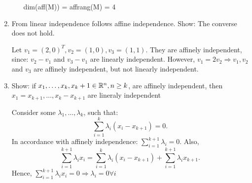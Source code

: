\documentclass{homework}
\begin{document}
\begin{enumerate}[label=(\alph*)]
\begin{enumerate}[label=(\roman*)]
dim(aff(M)) = affrang(M) = 4
\end{enumerate}
\item From linear independence follows affine independence. Show: The converse does not hold.

Let $v_1 = (2, 0)^T, v_2 = (1, 0), v_3 = (1, 1)$. They are affinely independent, since: $v_2 - v_1$ and $v_3 - v_1$ are linearly independent. However, $v_1 = 2 v_2 \Rightarrow v_1, v_2$ and $v_3$ are affinely independent, but not linearly independent.
\item Show: if $x_1, \dots, x_k, x_k+1 \in \mathbb R^n, n \geq k$, are affinely independent, then $x_1 = x_{k+1}, \dots, x_k - x_{k+1}$ are lineraly independent

Consider some $\lambda_1, \dots, \lambda_k$, such that: \[\sum_{i=1}^k \lambda_i(x_i - x_{k+1})=0.\] In accordance with affinely independence: $\sum_{i=1}^{k+1}\lambda_i = 0$. Also, \[\sum_{i=1}^{k+1}\lambda_i x_i = \sum_{i=1}^{k}\lambda_i(x_i - x_{k+1}) + \sum_{i=1}^{k+1}\lambda_i x_{k+1}.\] Hence,  $\sum_{i=1}^{k+1}\lambda_i x_i = 0 \Rightarrow \lambda_i = 0 \forall i$
\end{enumerate}
\end{document}
